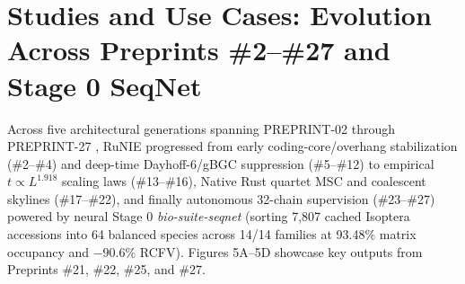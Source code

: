 \documentclass[11pt,twocolumn]{article}
\begin{document}
\section{Studies and Use Cases: Evolution Across Preprints \#2--\#27 and Stage 0 SeqNet}
Across five architectural generations spanning PREPRINT-02 through PREPRINT-27 \cite{white2026_p02,white2026_p03,white2026_p04,white2026_p05,white2026_p06,white2026_p07,white2026_p08,white2026_p09,white2026_p10,white2026_p11,white2026_p12,white2026_p13,white2026_p14,white2026_p15,white2026_p16,white2026_p17,white2026_p18,white2026_p19,white2026_p20,white2026_p21,white2026_p22,white2026_p23,white2026_p24,white2026_p25,white2026_p26,white2026_p27}, RuNIE progressed from early coding-core/overhang stabilization (\#2--\#4) and deep-time Dayhoff-6/gBGC suppression (\#5--\#12) to empirical $t \propto L^{1.918}$ scaling laws (\#13--\#16), Native Rust quartet MSC and coalescent skylines (\#17--\#22), and finally autonomous 32-chain supervision (\#23--\#27) powered by neural Stage 0 \emph{bio-suite-seqnet} (sorting 7,807 cached Isoptera accessions into 64 balanced species across 14/14 families at 93.48\% matrix occupancy and $-90.6\%$ RCFV). Figures 5A--5D showcase key outputs from Preprints \#21, \#22, \#25, and \#27.
\end{document}
